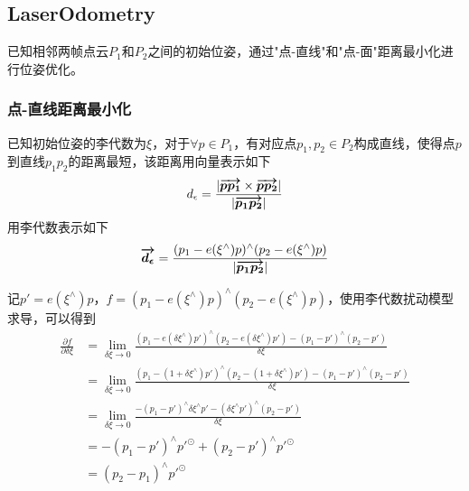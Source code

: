\subsection{LaserOdometry}
已知相邻两帧点云$P_1$和$P_2$之间的初始位姿，通过"点-直线"和"点-面"距离最小化进行位姿优化。
\subsubsection{点-直线距离最小化}
已知初始位姿的李代数为$\xi$，对于$\forall p \in P_1$，有对应点$p_1,p_2 \in P_2$构成直线，使得点$p$到直线$p_1p_2$的距离最短，该距离用向量表示如下
\begin{equation}
	d_{\epsilon} =
	\frac{|\boldmath\overrightarrow{p p_1}\unboldmath \times \boldmath\overrightarrow{p p_2}\unboldmath|}{|\boldmath\overrightarrow{p_1 p_2}\unboldmath|}
\end{equation}
用李代数表示如下
\begin{equation}
	\boldmath\overrightarrow{d_{\epsilon}}\unboldmath =
	\frac{(p_1-e(\xi ^\wedge)p)^\wedge(p_2-e(\xi ^\wedge)p)}{|\boldmath\overrightarrow{p_1 p_2}\unboldmath|}
\end{equation}
\par 记$p'=e(\xi ^\wedge)p$，$f=(p_1-e(\xi ^\wedge)p) ^\wedge (p_2-e(\xi ^\wedge)p)$，使用李代数扰动模型求导，可以得到
\begin{equation}
	\begin{split}
		\frac{\partial f}{\partial \delta \xi}
		&=
		\lim\limits_{\delta \xi \rightarrow 0}
		\frac{(p_1-e(\delta \xi ^\wedge) p')
			^\wedge
			(p_2-e(\delta \xi ^\wedge) p')
			-
			(p_1-p') ^\wedge (p_2-p')
		}{\delta \xi} \\
		&=
		\lim\limits_{\delta \xi \rightarrow 0}
		\frac{(p_1-(1+\delta \xi ^\wedge) p')
			^\wedge
			(p_2-(1+\delta \xi ^\wedge) p')
			-
			(p_1-p') ^\wedge (p_2-p')
		}{\delta \xi} \\
		&=
		\lim\limits_{\delta \xi \rightarrow 0}
		\frac{-(p_1-p')^\wedge\delta\xi^\wedge p'- (\delta\xi^\wedge p')^\wedge(p_2-p')}{\delta \xi} \\
		&=
		- (p_1-p')^\wedge p'^\odot + (p_2-p')^\wedge p'^\odot \\
		&=
		(p_2 - p_1)^\wedge p'^\odot
	\end{split}
\end{equation}

